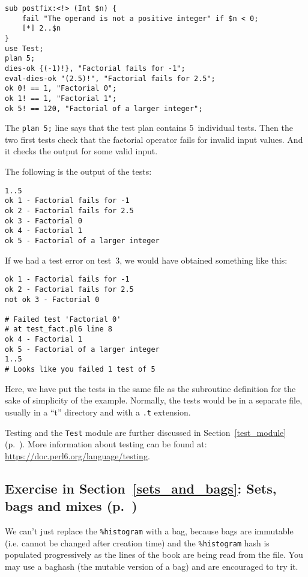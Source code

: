{\begin{verbatim}
sub postfix:<!> (Int $n) {
    fail "The operand is not a positive integer" if $n < 0;
    [*] 2..$n
}
use Test;
plan 5;
dies-ok {(-1)!}, "Factorial fails for -1";
eval-dies-ok "(2.5)!", "Factorial fails for 2.5";
ok 0! == 1, "Factorial 0";
ok 1! == 1, "Factorial 1";
ok 5! == 120, "Factorial of a larger integer";
\end{verbatim}

The {\tt plan 5;} line says that the test plan contains 
5~individual tests. Then the two first tests check that 
the factorial operator fails for invalid input values. And 
it checks the output for some valid input.

The following is the output of the tests:

\begin{verbatim}
1..5
ok 1 - Factorial fails for -1
ok 2 - Factorial fails for 2.5
ok 3 - Factorial 0
ok 4 - Factorial 1
ok 5 - Factorial of a larger integer
\end{verbatim}

If we had a test error on test~3, we would have obtained 
something like this:

\begin{verbatim}
ok 1 - Factorial fails for -1
ok 2 - Factorial fails for 2.5
not ok 3 - Factorial 0

# Failed test 'Factorial 0'
# at test_fact.pl6 line 8
ok 4 - Factorial 1
ok 5 - Factorial of a larger integer
1..5
# Looks like you failed 1 test of 5
\end{verbatim}

Here, we have put the tests in the same file as the subroutine 
definition for the sake of simplicity of the example. Normally, 
the tests would be in a separate file, usually in a ``t'' 
directory and with a \verb'.t' extension.

Testing and the {\tt Test} module are further discussed  
in Section~\ref{test_module} (p.~\pageref{test_module}).
More information about testing can be found at: 
\url{https://doc.perl6.org/language/testing}.

\subsection{Exercise in Section~\ref{sets_and_bags}: Sets, bags and mixes (p.~\pageref{diff_with_set})}
\label{sol_diff_with_set}

We can't just replace the \verb'%histogram' with a bag, because 
bags are immutable (i.e. cannot be changed after creation time) 
and the \verb'%histogram' hash is populated progressively as 
the lines of the book are being read from the file. You may use 
a baghash (the mutable version of a bag) and are encouraged 
to try it.

}
